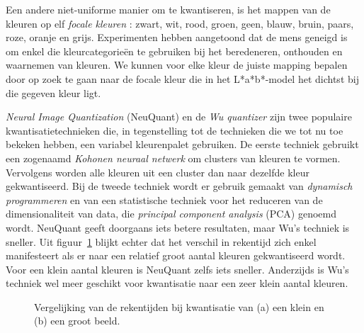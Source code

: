Een andere niet-uniforme manier om te kwantiseren, is het mappen van de kleuren op elf 
\emph{focale kleuren} \cite{van_den_broek:human_color_categorization_for_cbir}: zwart, wit, rood, groen, geen, blauw, bruin, paars, roze, oranje en grijs.
Experimenten hebben aangetoond dat de mens geneigd is om enkel die kleurcategorie\"en te gebruiken bij 
het beredeneren, onthouden en waarnemen van kleuren. We kunnen voor elke kleur de juiste mapping bepalen
door op zoek te gaan naar de focale kleur die in het L*a*b*-model het dichtst bij die gegeven kleur ligt.

\emph{Neural Image Quantization} (NeuQuant) \cite{dekker:neuquant} en de \emph{Wu quantizer} 
\cite{wu:color_quantization_by_dynamic_programming_and_principal_analysis} zijn twee
populaire kwantisatietechnieken die, in tegenstelling tot de technieken die we 
tot nu toe bekeken hebben, een variabel kleurenpalet gebruiken. De eerste techniek gebruikt een
zogenaamd \emph{Kohonen neuraal netwerk} om clusters van kleuren te vormen. Vervolgens worden 
alle kleuren uit een cluster dan naar dezelfde kleur gekwantiseerd. Bij de tweede techniek 
wordt er gebruik gemaakt van \emph{dynamisch programmeren} en van een statistische techniek voor 
het reduceren van de dimensionaliteit van data, 
die \emph{principal component analysis} (PCA) genoemd wordt. 
NeuQuant geeft doorgaans iets betere resultaten, maar Wu's techniek is
sneller. Uit figuur~\ref{fig:rekentijden_quant} blijkt echter dat het verschil in rekentijd zich
enkel manifesteert als er naar een relatief groot aantal kleuren gekwantiseerd wordt. Voor een
klein aantal kleuren is NeuQuant zelfs iets sneller. Anderzijds is Wu's techniek wel meer
geschikt voor kwantisatie naar een zeer klein aantal kleuren.
 

\begin{figure}[bp]
\vspace{10pt}
\centering
{}
\caption{\label{fig:rekentijden_quant}Vergelijking van de rekentijden bij kwantisatie van 
(a) een klein en (b) een groot beeld.}
\end{figure}

